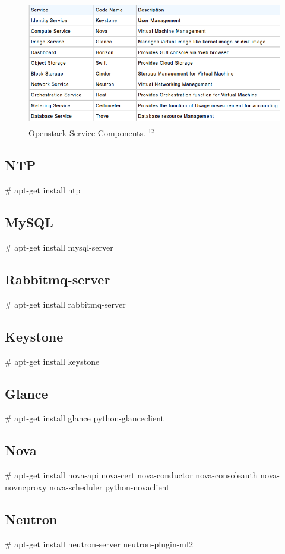 \documentclass[12pt]{report}
\begin{document}
\begin{figure}[H]
	\begin{center}
	\includegraphics[width=14cm,height=5.5cm]{./openstack_4.png}
	\caption{ Openstack Service Components. $^{12}$ \label{fig:Openstack Service Components }}
	\end{center}
\end{figure}

\subsection{NTP}
\# apt-get install ntp
\subsection{MySQL}
\# apt-get install mysql-server
\subsection{Rabbitmq-server}
\# apt-get install rabbitmq-server
\subsection{Keystone}
\# apt-get install keystone
\subsection{Glance}
\# apt-get install glance python-glanceclient
\subsection{Nova}
\# apt-get install nova-api nova-cert nova-conductor nova-consoleauth nova-novncproxy nova-scheduler python-novaclient
\subsection{Neutron}
\# apt-get install neutron-server neutron-plugin-ml2
\pagebreak
\end{document}
